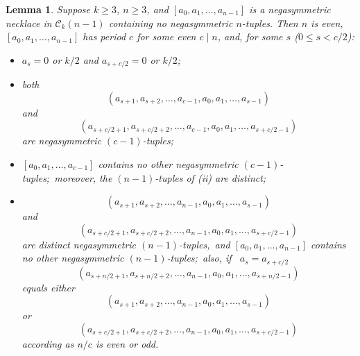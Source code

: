 \documentclass[10pt,a4paper]{amsart}
\newtheorem{lemma}{Lemma}
\begin{document}
\begin{lemma}  \label{lemma:nega_circuit_no_nega_tuples}
Suppose $k\geq3$, $n\geq 3$, and $[a_0,a_1,\dots,a_{n-1}]$ is a negasymmetric necklace in
$\mathcal{C}_k(n-1)$ containing no negasymmetric $n$-tuples.  Then $n$ is even,
$[a_0,a_1,\dots,a_{n-1}]$ has  period $c$ for some even $c\mid n$, and, for some $s$ ($0\leq s<
c/2$):
\begin{itemize}
\item[(i)] $a_{s}=0$ or $k/2$ and $a_{s+c/2}=0$ or $k/2$;
\item[(ii)] both
\[ (a_{s+1},a_{s+2},\dots,a_{c-1},a_0,a_1,\dots,a_{s-1}) \]
and
\[ (a_{s+c/2+1},a_{s+c/2+2},\dots,a_{c-1},a_0,a_1,\dots,a_{s+c/2-1}) \]
are negasymmetric $(c-1)$-tuples;
\item[(iii)] $[a_0,a_1,\dots,a_{c-1}]$ contains no other negasymmetric
    $(c-1)$-tuples;~moreover, the
    $(n-1)$-tuples of (ii) are distinct;
\item[(iv)]
\[ (a_{s+1},a_{s+2},\dots,a_{n-1},a_0,a_1,\dots,a_{s-1}) \]
and
\[ (a_{s+c/2+1},a_{s+c/2+2},\dots,a_{n-1},a_0,a_1,\dots,a_{s+c/2-1}) \]
are distinct negasymmetric $(n-1)$-tuples,~and
 $[a_0,a_1,\dots,a_{n-1}]$ contains no other negasymmetric $(n-1)$-tuples;~also, if~
 $a_s=a_{s+c/2}$
\[ (a_{s+n/2+1},a_{s+n/2+2},\dots,a_{n-1},a_0,a_1,\dots,a_{s+n/2-1}) \]
 equals either
 \[ (a_{s+1},a_{s+2},\dots,a_{n-1},a_0,a_1,\dots,a_{s-1}) \]
or
\[ (a_{s+c/2+1},a_{s+c/2+2},\dots,a_{n-1},a_0,a_1,\dots,a_{s+c/2-1}) \]
according as $n/c$ is even or odd.
\end{itemize}
\end{lemma}
\end{document}
